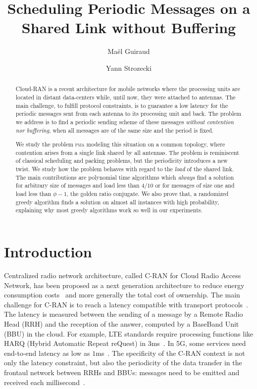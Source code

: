 \documentclass[a4paper,UKenglish,cleveref, autoref, thm-restate]{lipics-v2019}
\title{Scheduling Periodic Messages on a Shared Link without Buffering} %
\author{Ma\"el Guiraud}{CESI, France \and Nokia Bell Labs, France}{mael.guiraud@uvsq.fr}{}{}
\author{Yann Strozecki}{David Laboratory, UVSQ, France }{yann.strozecki@uvsq.fr}{}{}%
\newcommand\pma{\textsc{pma}\xspace}
\begin{document}
\maketitle


\begin{abstract}
Cloud-RAN is a recent architecture for mobile networks where the processing units are located in distant data-centers while, until now, they were attached to antennas. The main challenge, to fulfill protocol constraints, is to guarantee a low latency for the periodic messages sent from each antenna to its processing unit and back. The problem we address is to find a periodic sending scheme of these messages \emph{without contention nor buffering}, when all messages are of the same size and the period is fixed.

We study the problem \pma modeling this situation on a common topology, where contention arises from a single link shared by all antennas. The problem is reminiscent of classical scheduling and packing problems, but the periodicity introduces a new twist. We study how the problem behaves with regard to the \emph{load} of the shared link. 
The main contributions are polynomial time algorithms which \emph{always} find a solution for arbitrary size of messages and load less than $4/10$ or for messages of size one and load less than $\phi - 1$, the golden ratio conjugate. We also prove that, a randomized greedy algorithm finds a solution on almost all instances with high probability, explaining why most greedy algorithms work so well in our experiments.
\end{abstract}


\section{Introduction}

Centralized radio network architecture, called C-RAN for Cloud Radio Access Network, has been proposed as a next generation architecture to reduce energy consumption costs~\cite{mobile2011c} and more generally the total cost of ownership. The main challenge for C-RAN is to reach a latency compatible with transport protocols~\cite{ieeep802}. The latency is measured between the sending of a message by a Remote Radio Head (RRH) and the reception of the answer, computed by a BaseBand Unit (BBU) in the cloud. For example, LTE standards require processing functions like HARQ (Hybrid Automatic Repeat reQuest) in $3$ms~\cite{bouguen2012lte}. In 5G, some services need end-to-end latency as low as $1$ms~\cite{3gpp5g,boccardi2014five}. The specificity of the C-RAN context is not only the latency constraint, but also the periodicity of the data transfer in the frontaul network between RRHs and BBUs: messages need to be emitted and received each millisecond~\cite{bouguen2012lte}. 
\end{document}
